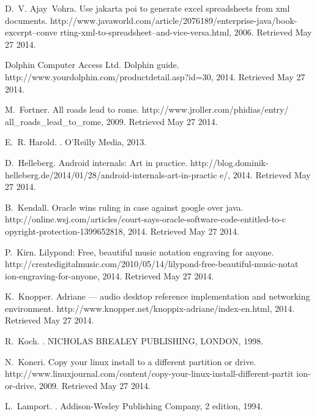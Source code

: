 \documentclass{acm_proc_article-sp}
\begin{document}
\begin{thebibliography}{10}

D.~V. Ajay~Vohra.
\newblock Use jakarta poi to generate excel spreadsheets from xml documents.
\newblock
  http://www.javaworld.com/article/2076189/enterprise-java/book-excerpt--conve%
rting-xml-to-spreadsheet--and-vice-versa.html, 2006.
\newblock Retrieved May 27 2014.

Dolphin Computer Access Ltd.
\newblock Dolphin guide.
\newblock http://www.yourdolphin.com/productdetail.asp?id=30, 2014.
\newblock Retrieved May 27 2014.

M.~Fortner.
\newblock All roads lead to rome.
\newblock http://www.jroller.com/phidias/entry/ all\_roads\_lead\_to\_rome,
  2009.
\newblock Retrieved May 27 2014.

E.~R. Harold.
.
\newblock O'Reilly Media, 2013.

D.~Helleberg.
\newblock Android internals: Art in practice.
\newblock
  http://blog.dominik-helleberg.de/2014/01/28/android-internals-art-in-practic%
e/, 2014.
\newblock Retrieved May 27 2014.

B.~Kendall.
\newblock Oracle wins ruling in case against google over java.
\newblock
  http://online.wsj.com/articles/court-says-oracle-software-code-entitled-to-c%
opyright-protection-1399652818, 2014.
\newblock Retrieved May 27 2014.

P.~Kirn.
\newblock Lilypond: Free, beautiful music notation engraving for anyone.
\newblock
  http://createdigitalmusic.com/2010/05/14/lilypond-free-beautiful-music-notat%
ion-engraving-for-anyone, 2014.
\newblock Retrieved May 27 2014.

K.~Knopper.
\newblock Adriane --- audio desktop reference implementation and networking
  environment.
\newblock http://www.knopper.net/knoppix-adriane/index-en.html, 2014.
\newblock Retrieved May 27 2014.

R.~Koch.
.
\newblock NICHOLAS BREALEY PUBLISHING, LONDON, 1998.

N.~Koneri.
\newblock Copy your linux install to a different partition or drive.
\newblock
  http://www.linuxjournal.com/content/copy-your-linux-install-different-partit%
ion-or-drive, 2009.
\newblock Retrieved May 27 2014.

L.~Lamport.
.
\newblock Addison-Wesley Publishing Company, 2 edition, 1994.


\end{thebibliography}
\end{document}
